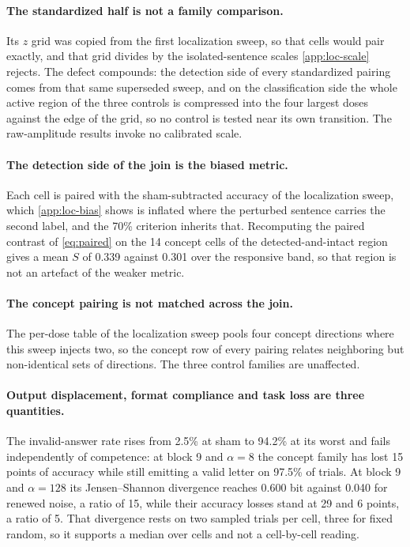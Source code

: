 \paragraph{The standardized half is not a family comparison.}
Its $z$ grid was copied from the first localization sweep, so that cells would
pair exactly, and that grid divides by the isolated-sentence scales
\cref{app:loc-scale} rejects. The defect compounds: the detection side of every
standardized pairing comes from that same superseded sweep, and on the
classification side the whole active region of the three controls is
compressed into the four largest doses against the edge of the grid, so no
control is tested near its own transition. The raw-amplitude results invoke no
calibrated scale.

\paragraph{The detection side of the join is the biased metric.}
Each cell is paired with the sham-subtracted accuracy of the localization
sweep, which \cref{app:loc-bias} shows is inflated where the perturbed
sentence carries the second label, and the 70\% criterion inherits that.
Recomputing the paired contrast of \cref{eq:paired} on the 14 concept cells of
the detected-and-intact region gives a mean $S$ of 0.339 against 0.301 over
the responsive band, so that region is not an artefact of the weaker metric.

\paragraph{The concept pairing is not matched across the join.}
The per-dose table of the localization sweep pools four concept directions
where this sweep injects two, so the concept row of every pairing relates
neighboring but non-identical sets of directions. The three control families
are unaffected.

\paragraph{Output displacement, format compliance and task loss are three
quantities.}
The invalid-answer rate rises from 2.5\% at sham to 94.2\% at its worst and
fails independently of competence: at block 9 and $\alpha=8$ the concept
family has lost 15 points of accuracy while still emitting a valid letter on
97.5\% of trials. At block 9 and $\alpha=128$ its Jensen--Shannon divergence
reaches 0.600 bit against 0.040 for renewed noise, a ratio of 15, while their
accuracy losses stand at 29 and 6 points, a ratio of 5. That divergence rests
on two sampled trials per cell, three for fixed random, so it supports a median
over cells and not a cell-by-cell reading.

